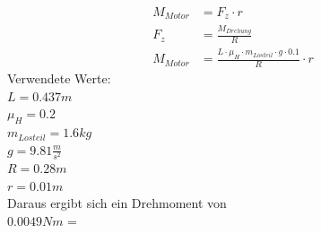 \begin{align}
    M_{Motor} &= F_z \cdot r\\
    F_z &= \frac{M_{Drehung}}{R}\\
    M_{Motor} &=\frac{L \cdot \mu_H \cdot m_{Losteil} \cdot g \cdot 0.1}{R} \cdot r
\end{align}
Verwendete Werte:\\
$L = 0.437m$\\
$\mu_H = 0.2$\\
$m_{Losteil} = 1.6 kg$\\
$g = 9.81 \frac{m}{s^2}$\\
$R = 0.28 m$\\
$r = 0.01 m$\\
Daraus ergibt sich ein Drehmoment von \\
$0.0049 Nm$ = \\
